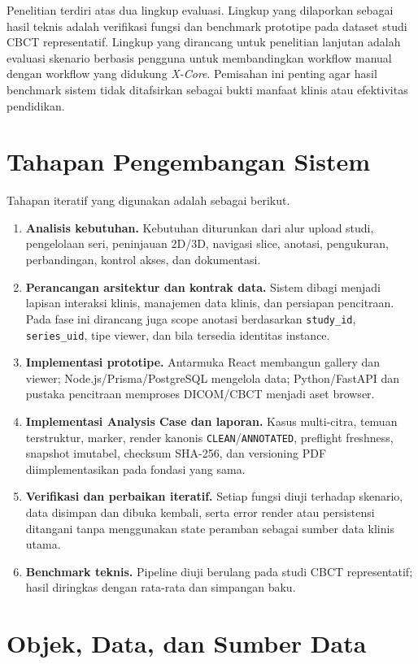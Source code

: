 \documentclass[12pt,a4paper,oneside]{report}
\newcommand{\xcore}{\textit{X-Core}}
\begin{document}
Penelitian terdiri atas dua lingkup evaluasi. Lingkup yang dilaporkan sebagai hasil teknis adalah verifikasi fungsi dan benchmark prototipe pada dataset studi CBCT representatif. Lingkup yang dirancang untuk penelitian lanjutan adalah evaluasi skenario berbasis pengguna untuk membandingkan workflow manual dengan workflow yang didukung \xcore{}. Pemisahan ini penting agar hasil benchmark sistem tidak ditafsirkan sebagai bukti manfaat klinis atau efektivitas pendidikan.

\section{Tahapan Pengembangan Sistem}

Tahapan iteratif yang digunakan adalah sebagai berikut.
\begin{enumerate}[label=\arabic*.]
  \item \textbf{Analisis kebutuhan.} Kebutuhan diturunkan dari alur upload studi, pengelolaan seri, peninjauan 2D/3D, navigasi slice, anotasi, pengukuran, perbandingan, kontrol akses, dan dokumentasi.
  \item \textbf{Perancangan arsitektur dan kontrak data.} Sistem dibagi menjadi lapisan interaksi klinis, manajemen data klinis, dan persiapan pencitraan. Pada fase ini dirancang juga scope anotasi berdasarkan \texttt{study\_id}, \texttt{series\_uid}, tipe viewer, dan bila tersedia identitas instance.
  \item \textbf{Implementasi prototipe.} Antarmuka React membangun gallery dan viewer; Node.js/Prisma/PostgreSQL mengelola data; Python/FastAPI dan pustaka pencitraan memproses DICOM/CBCT menjadi aset browser.
  \item \textbf{Implementasi Analysis Case dan laporan.} Kasus multi-citra, temuan terstruktur, marker, render kanonis \texttt{CLEAN}/\texttt{ANNOTATED}, preflight freshness, snapshot imutabel, checksum SHA-256, dan versioning PDF diimplementasikan pada fondasi yang sama.
  \item \textbf{Verifikasi dan perbaikan iteratif.} Setiap fungsi diuji terhadap skenario, data disimpan dan dibuka kembali, serta error render atau persistensi ditangani tanpa menggunakan state peramban sebagai sumber data klinis utama.
  \item \textbf{Benchmark teknis.} Pipeline diuji berulang pada studi CBCT representatif; hasil diringkas dengan rata-rata dan simpangan baku.
\end{enumerate}

\section{Objek, Data, dan Sumber Data}
\end{document}
